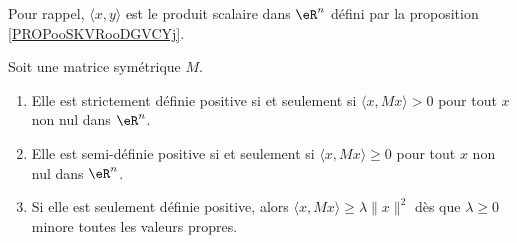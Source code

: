 Pour rappel, \( \langle x, y\rangle \) est le produit scalaire dans \( \eR^n\) défini par la proposition \ref{PROPooSKVRooDGVCYj}.

\begin{lemma}   \label{LemWZFSooYvksjw}
	Soit une matrice symétrique \( M\).
	\begin{enumerate}
		\item       \label{ITEMooSKRAooOgHbGA}
		      Elle est strictement définie positive si et seulement si \( \langle x, Mx\rangle >0\) pour tout \( x\) non nul dans \( \eR^n\).
		\item       \label{ITEMooMOZYooWcrewZ}
		      Elle est semi-définie positive si et seulement si \( \langle x, Mx\rangle \geq 0\) pour tout \( x\) non nul dans \( \eR^n\).
		\item        \label{ITEMooRRMFooHSOHxZ}
		      Si elle est seulement définie positive, alors \( \langle x, Mx\rangle \geq \lambda\| x \|^2\) dès que \( \lambda\geq 0\) minore toutes les valeurs propres.
	\end{enumerate}
\end{lemma}

